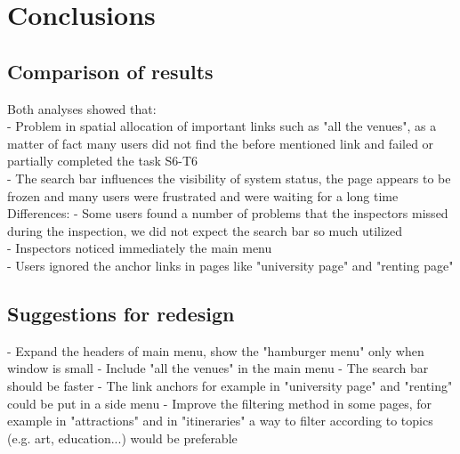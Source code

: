 
\section{Conclusions}
\subsection{Comparison of results}
Both analyses showed that:\\
- Problem in spatial allocation of important links such as "all the venues", as a matter of fact many users did not find the before mentioned link and failed or partially completed the task S6-T6\\
- The search bar influences the visibility of system status, the page appears to be frozen and many users were frustrated and were waiting for a long time\\

Differences:
- Some users found a number of problems that the inspectors missed during the inspection, we did not expect the search bar so much utilized\\
- Inspectors noticed immediately the main menu\\
- Users ignored the anchor links in pages like "university page" and "renting page"
\subsection{Suggestions for redesign}
- Expand the headers of main menu, show the "hamburger menu" only when window is small
- Include "all the venues" in the main menu
- The search bar should be faster
- The link anchors for example in "university page" and "renting" could be put in a side menu
- Improve the filtering method in some pages, for example in "attractions" and in "itineraries" a way to filter according to topics (e.g. art, education...) would be preferable